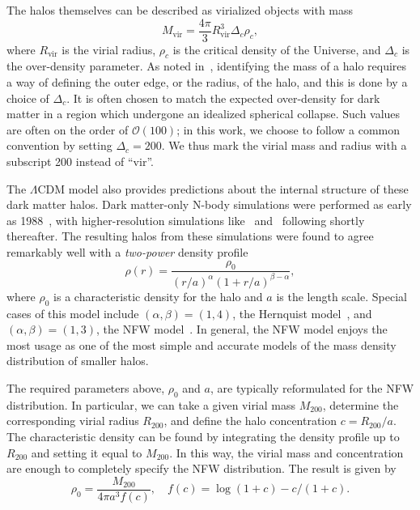 The halos themselves can be described as virialized objects with mass
\begin{equation}
M_{\text{vir}} = \frac{4\pi}{3} R_{\text{vir}}^3 \Delta_c \rho_c,
\end{equation}
where \(R_{\text{vir}}\) is the virial radius, \(\rho_c\) is the
critical density of the Universe, and \(\Delta_c\) is the over-density
parameter. As noted in~\cite{bullock_small-scale_2017}, identifying the mass of
a halo requires a way of defining the outer edge, or the radius, of the halo,
and this is done by a choice of $\Delta_c$. It is often chosen to match the
expected over-density for dark matter in a region which undergone an idealized
spherical collapse. Such values are often on the order of $\mathcal{O}(100)$; in
this work, we choose to follow a common convention by setting \(\Delta_c =
200\).  We thus mark the virial mass and radius with a subscript 200 instead
of ``vir''.

The \(\Lambda\)CDM model also provides predictions about the internal
structure of these dark matter halos. Dark matter-only N-body simulations were
performed as early as 1988~\cite{frenk_formation_1988}, with higher-resolution
simulations like~\cite{dubinski_structure_1991}
and~\cite{navarro_structure_1995} following shortly thereafter. The resulting
halos from these simulations were found to agree remarkably well with a
\emph{two-power} density profile~\cite{binney_galactic_2008} 
\begin{equation} \label{eq:twopower}
\rho(r) = \frac{\rho_0}{(r/a)^\alpha (1 + r/a)^{\beta-\alpha}}, 
\end{equation}
where \(\rho_0\) is a characteristic density for the halo and \(a\) is the
length scale. Special cases of this model include \((\alpha,\beta) = (1,4)\),
the Hernquist model~\cite{hernquist_analytical_1990}, and \((\alpha,\beta) =
(1,3)\), the NFW model~\cite{navarro_structure_1995,navarro_universal_1997}.
In general, the NFW model enjoys the most usage as one of the most simple and
accurate models of the mass density distribution of smaller halos.

The required parameters above, \(\rho_0\) and \(a\), are typically
reformulated for the NFW distribution. In particular, we can take a
given virial mass \(M_{200}\), determine the corresponding virial radius
\(R_{200}\), and define the halo concentration \(c = R_{200} / a\). The
characteristic density can be found by integrating the density profile
up to \(R_{200}\) and setting it equal to \(M_{200}\). In this way, the
virial mass and concentration are enough to completely specify the NFW
distribution. The result is given by
\begin{equation}
\rho_0 = \frac{M_{200}}{4 \pi a^3 f(c)}, \quad 
f(c) = \log(1+c) - c/(1+c).
\end{equation}

